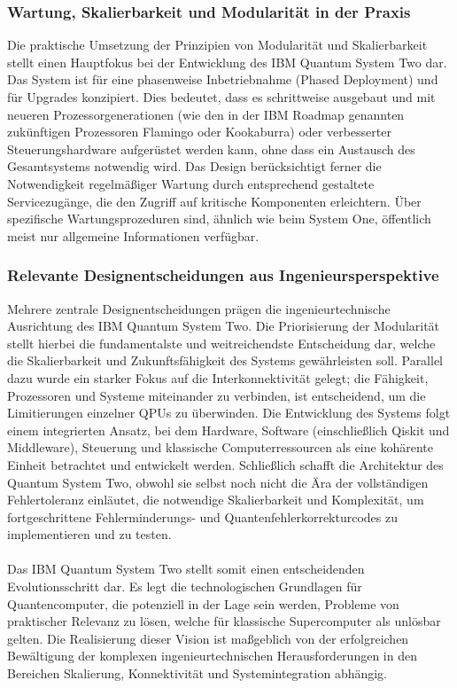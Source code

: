 \subsubsection{Wartung, Skalierbarkeit und Modularität in der Praxis}
Die praktische Umsetzung der Prinzipien von Modularität und Skalierbarkeit stellt einen Hauptfokus bei der Entwicklung des IBM Quantum System Two dar. Das System ist für eine phasenweise Inbetriebnahme (Phased Deployment) und für Upgrades konzipiert. Dies bedeutet, dass es schrittweise ausgebaut und mit neueren Prozessorgenerationen (wie den in der IBM Roadmap genannten zukünftigen Prozessoren Flamingo oder Kookaburra) oder verbesserter Steuerungshardware aufgerüstet werden kann, ohne dass ein Austausch des Gesamtsystems notwendig wird. Das Design berücksichtigt ferner die Notwendigkeit regelmäßiger Wartung durch entsprechend gestaltete Servicezugänge, die den Zugriff auf kritische Komponenten erleichtern. Über spezifische Wartungsprozeduren sind, ähnlich wie beim System One, öffentlich meist nur allgemeine Informationen verfügbar.

\subsubsection{Relevante Designentscheidungen aus Ingenieursperspektive}
Mehrere zentrale Designentscheidungen prägen die ingenieurtechnische Ausrichtung des IBM Quantum System Two. Die Priorisierung der Modularität stellt hierbei die fundamentalste und weitreichendste Entscheidung dar, welche die Skalierbarkeit und Zukunftsfähigkeit des Systems gewährleisten soll. Parallel dazu wurde ein starker Fokus auf die Interkonnektivität gelegt; die Fähigkeit, Prozessoren und Systeme miteinander zu verbinden, ist entscheidend, um die Limitierungen einzelner QPUs zu überwinden. Die Entwicklung des Systems folgt einem integrierten Ansatz, bei dem Hardware, Software (einschließlich Qiskit und Middleware), Steuerung und klassische Computerressourcen als eine kohärente Einheit betrachtet und entwickelt werden. Schließlich schafft die Architektur des Quantum System Two, obwohl sie selbst noch nicht die Ära der vollständigen Fehlertoleranz einläutet, die notwendige Skalierbarkeit und Komplexität, um fortgeschrittene Fehlerminderungs- und Quantenfehlerkorrekturcodes zu implementieren und zu testen. %
\\\\
Das IBM Quantum System Two stellt somit einen entscheidenden Evolutionsschritt dar. Es legt die technologischen Grundlagen für Quantencomputer, die potenziell in der Lage sein werden, Probleme von praktischer Relevanz zu lösen, welche für klassische Supercomputer als unlösbar gelten. Die Realisierung dieser Vision ist maßgeblich von der erfolgreichen Bewältigung der komplexen ingenieurtechnischen Herausforderungen in den Bereichen Skalierung, Konnektivität und Systemintegration abhängig.


\printbibliography


